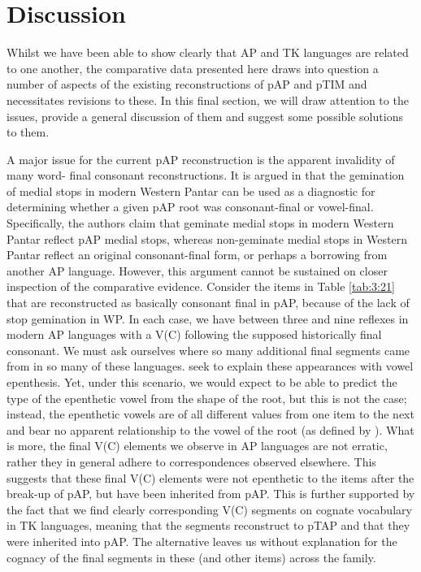 \section{Discussion}\label{sec:3:4}
Whilst we have been able to show clearly that AP and TK languages are related to one another, the comparative data presented here draws into question a number of aspects of the existing reconstructions of pAP and pTIM and necessitates revisions to these. In this final section, we will draw attention to the issues, provide a general discussion of them and suggest some possible solutions to them. 

A major issue for the current pAP reconstruction is the apparent invalidity of many word- final consonant reconstructions. It is argued in \citet[95]{HoltonEtAl2012} that the gemination of medial stops in modern Western Pantar can be used as a diagnostic for determining whether a given pAP root was consonant-final or vowel-final. Specifically, the authors claim that geminate medial stops in modern Western Pantar reflect pAP medial stops, whereas non-geminate medial stops in Western Pantar reflect an original consonant-final form, or perhaps a borrowing from another AP language. However, this argument cannot be sustained on closer inspection of the comparative evidence. Consider the items in Table \ref{tab:3:21} that are reconstructed as basically consonant final in pAP, because of the lack of stop gemination in WP. In each case, we have between three and nine reflexes in modern AP languages with a V(C) following the supposed historically final consonant. We must ask ourselves where so many additional final segments came from in so many of these languages. \citet{HoltonEtAl2012} seek to explain these appearances with vowel epenthesis. Yet, under this scenario, we would expect to be able to predict the type of the epenthetic vowel from the shape of the root, but this is not the case; instead, the epenthetic vowels are of all different values from one item to the next and bear no apparent relationship to the vowel of the root (as defined by \citealt{HoltonEtAl2012}). What is more, the final V(C) elements we observe in AP languages are not erratic, rather they in general adhere to correspondences observed elsewhere. This suggests that these final V(C) elements were not epenthetic to the items after the break-up of pAP, but have been inherited from pAP. This is further supported by the fact that we find clearly corresponding V(C) segments on cognate vocabulary in TK languages, meaning that the segments reconstruct to pTAP and that they were inherited into pAP. The alternative leaves us without explanation for the cognacy of the final segments in these (and other items) across the family. 
 

